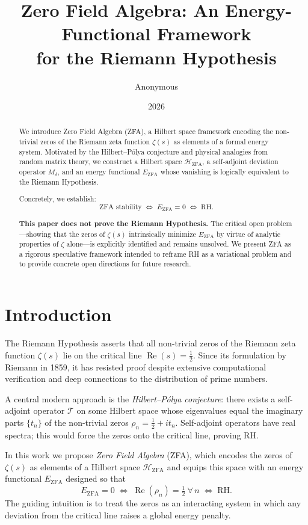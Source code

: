 \documentclass[12pt]{article}
\title{\textbf{Zero Field Algebra: An Energy-Functional Framework\\
for the Riemann Hypothesis}}
\author{Anonymous}
\date{2026}
\theoremstyle{definition}
\newcommand{\HZFA}{\mathcal{H}_{\mathrm{ZFA}}}
\newcommand{\EZFA}{E_{\mathrm{ZFA}}}
\newcommand{\Mdelta}{M_{\delta}}
\begin{document}
\maketitle

\begin{abstract}
We introduce Zero Field Algebra (ZFA), a Hilbert space framework
encoding the non-trivial zeros of the Riemann zeta function
$\zeta(s)$ as elements of a formal energy system.
Motivated by the Hilbert--P\'olya conjecture and physical analogies
from random matrix theory, we construct a Hilbert space $\HZFA$,
a self-adjoint deviation operator $\Mdelta$, and an energy functional
$\EZFA$ whose vanishing is logically equivalent to the Riemann
Hypothesis.

Concretely, we establish:
\[
  \text{ZFA stability}
  \;\iff\;
  \EZFA = 0
  \;\iff\;
  \text{RH}.
\]

\textbf{This paper does not prove the Riemann Hypothesis.}
The critical open problem---showing that the zeros of $\zeta(s)$
intrinsically minimize $\EZFA$ by virtue of analytic properties of
$\zeta$ alone---is explicitly identified and remains unsolved.
We present ZFA as a rigorous speculative framework intended to
reframe RH as a variational problem and to provide concrete open
directions for future research.
\end{abstract}

\tableofcontents
\newpage

\section{Introduction}

The Riemann Hypothesis asserts that all non-trivial zeros of the
Riemann zeta function $\zeta(s)$ lie on the critical line
$\operatorname{Re}(s) = \tfrac{1}{2}$.
Since its formulation by Riemann in 1859, it has resisted proof
despite extensive computational verification and deep connections to
the distribution of prime numbers.

A central modern approach is the \emph{Hilbert--P\'olya conjecture}:
there exists a self-adjoint operator $\mathcal{T}$ on some Hilbert
space whose eigenvalues equal the imaginary parts $\{t_n\}$ of the
non-trivial zeros $\rho_n = \tfrac{1}{2} + it_n$.
Self-adjoint operators have real spectra; this would force the zeros
onto the critical line, proving RH.

In this work we propose \emph{Zero Field Algebra} (ZFA), which encodes
the zeros of $\zeta(s)$ as elements of a Hilbert space $\HZFA$ and
equips this space with an energy functional $\EZFA$ designed so that
\[
  \EZFA = 0
  \;\iff\;
  \operatorname{Re}(\rho_n) = \tfrac{1}{2}\ \forall\, n
  \;\iff\;
  \text{RH}.
\]
The guiding intuition is to treat the zeros as an interacting system
in which any deviation from the critical line raises a global energy
penalty.
\end{document}
